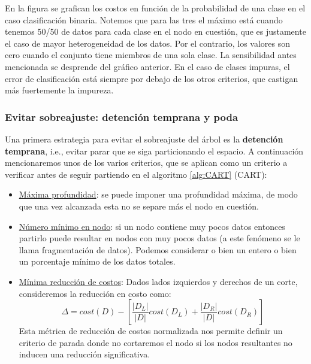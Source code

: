 En la figura se grafican los costos en función de la probabilidad de una clase en el caso clasificación binaria. Notemos que para las tres el máximo está cuando tenemos 50/50 de datos para cada clase en el nodo en cuestión, que es justamente el caso de mayor heterogeneidad de los datos. Por el contrario, los valores son cero cuando el conjunto tiene miembros de una sola clase. La sensibilidad antes mencionada se desprende del gráfico anterior. En el caso de clases impuras, el error de clasificación está siempre por debajo de los otros criterios, que castigan más fuertemente la impureza.



\subsubsection{Evitar sobreajuste: detención temprana y poda}

Una primera estrategia para evitar el sobreajuste del árbol es la \textbf{detención temprana}, i.e., evitar parar que se siga particionando el espacio. A continuación mencionaremos unos de los varios criterios, que se aplican como un criterio a verificar antes de seguir partiendo en el algoritmo \ref{alg:CART} (CART):

\begin{itemize}
    \item \underline{Máxima profundidad}:
    se puede imponer una profundidad máxima, de modo que una vez alcanzada esta no se separe más el nodo en cuestión.

    \item \underline{Número mínimo en nodo}: si un nodo contiene muy pocos datos entonces partirlo puede resultar en nodos con muy pocos datos (a este fenómeno se le llama fragmentación de datos). Podemos considerar o bien un entero o bien un porcentaje mínimo de los datos totales.

    \item \underline{Mínima reducción de costos}: Dados lados izquierdos y derechos de un corte, consideremos la reducción en costo como:
    \begin{equation}
        \Delta = cost(D) - \left[ \frac{|D_L|}{|D|} cost(D_L) + \frac{|D_R|}{|D|} cost(D_R) \right]
    \end{equation}
    Esta métrica de reducción de costos normalizada nos permite definir un criterio de parada donde no cortaremos el nodo si los nodos resultantes no inducen una reducción significativa. 
\end{itemize}

